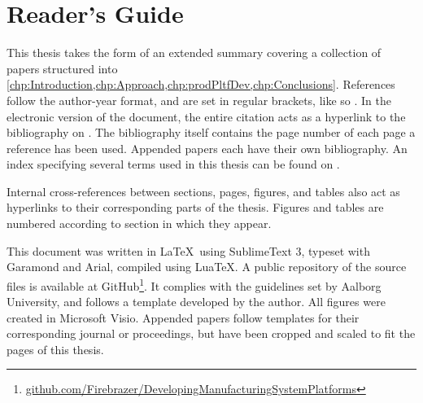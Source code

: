 \section*{Reader's Guide}\label{rGuide}
This \PhD{} thesis takes the form of an extended summary covering a collection of papers structured into \cref{chp:Introduction,chp:Approach,chp:prodPltfDev,chp:Conclusions}.
References follow the author-year format, and are set in regular brackets, like so \parencite{SorensenMCPC2017}.
In the electronic version of the document, the entire citation acts as a hyperlink to the bibliography on .
The bibliography itself contains the page number of each page a reference has been used.
Appended papers each have their own bibliography.
An index specifying several terms used in this thesis can be found on .

Internal cross-references between sections, pages, figures, and tables also act as hyperlinks to their corresponding parts of the thesis.
Figures and tables are numbered according to section in which they appear.

This document was written in \LaTeX~using SublimeText 3, typeset with Garamond and Arial, compiled using Lua\TeX.
A public repository of the source files is available at GitHub\footnote{\href{https://github.com/Firebrazer/DevelopingManufacturingSystemPlatforms}{github.com/Firebrazer/DevelopingManufacturingSystemPlatforms}}.
It complies with the guidelines set by Aalborg University, and follows a template developed by the author.
All figures were created in Microsoft Visio.
Appended papers follow templates for their corresponding journal or proceedings, but have been cropped and scaled to fit the pages of this thesis.